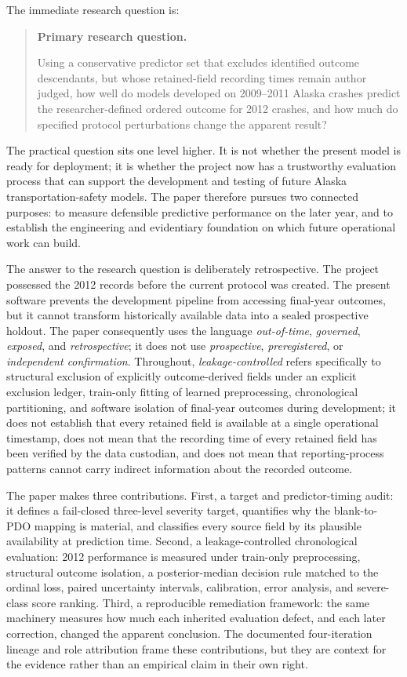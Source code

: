\documentclass[11pt,letterpaper]{article}
\newenvironment{researchquestion}{%
  \begin{quote}\singlespacing\noindent\textbf{Primary research question. }\itshape
}{%
  \end{quote}
}
\begin{document}
The immediate research question is:

\begin{researchquestion}
Using a conservative predictor set that excludes identified outcome descendants, but whose retained-field recording times remain author judged, how well do models developed on 2009--2011 Alaska crashes predict the researcher-defined ordered outcome for 2012 crashes, and how much do specified protocol perturbations change the apparent result?
\end{researchquestion}

The practical question sits one level higher. It is not whether the present model is ready for deployment; it is whether the project now has a trustworthy evaluation process that can support the development and testing of future Alaska transportation-safety models. The paper therefore pursues two connected purposes: to measure defensible predictive performance on the later year, and to establish the engineering and evidentiary foundation on which future operational work can build.

The answer to the research question is deliberately retrospective. The project possessed the 2012 records before the current protocol was created. The present software prevents the development pipeline from accessing final-year outcomes, but it cannot transform historically available data into a sealed prospective holdout. The paper consequently uses the language \emph{out-of-time}, \emph{governed}, \emph{exposed}, and \emph{retrospective}; it does not use \emph{prospective}, \emph{preregistered}, or \emph{independent confirmation}. Throughout, \emph{leakage-controlled} refers specifically to structural exclusion of explicitly outcome-derived fields under an explicit exclusion ledger, train-only fitting of learned preprocessing, chronological partitioning, and software isolation of final-year outcomes during development; it does not establish that every retained field is available at a single operational timestamp, does not mean that the recording time of every retained field has been verified by the data custodian, and does not mean that reporting-process patterns cannot carry indirect information about the recorded outcome.

The paper makes three contributions. First, a target and predictor-timing audit: it defines a fail-closed three-level severity target, quantifies why the blank-to-PDO mapping is material, and classifies every source field by its plausible availability at prediction time. Second, a leakage-controlled chronological evaluation: 2012 performance is measured under train-only preprocessing, structural outcome isolation, a posterior-median decision rule matched to the ordinal loss, paired uncertainty intervals, calibration, error analysis, and severe-class score ranking. Third, a reproducible remediation framework: the same machinery measures how much each inherited evaluation defect, and each later correction, changed the apparent conclusion. The documented four-iteration lineage and role attribution frame these contributions, but they are context for the evidence rather than an empirical claim in their own right.
\end{document}
